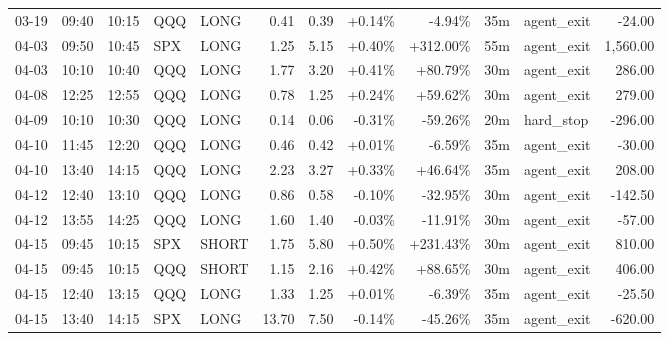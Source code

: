 \documentclass[11pt,a4paper,twoside]{article}
\begin{document}
\begin{center}
\begin{longtable}{>{\color{txtmain}}l l l l l r r r r r >{\color{txtmain}}l r}
03-19 & 09:40 & 10:15 & QQQ & LONG & 0.41 & 0.39 & \textcolor{wingreen}{+0.14\%} & \textcolor{lossred}{-4.94\%} & 35m & agent\_exit & \textcolor{lossred}{-24.00} \\
04-03 & 09:50 & 10:45 & SPX & LONG & 1.25 & 5.15 & \textcolor{wingreen}{+0.40\%} & \textcolor{wingreen}{+312.00\%} & 55m & agent\_exit & \textcolor{wingreen}{1,560.00} \\
04-03 & 10:10 & 10:40 & QQQ & LONG & 1.77 & 3.20 & \textcolor{wingreen}{+0.41\%} & \textcolor{wingreen}{+80.79\%} & 30m & agent\_exit & \textcolor{wingreen}{286.00} \\
04-08 & 12:25 & 12:55 & QQQ & LONG & 0.78 & 1.25 & \textcolor{wingreen}{+0.24\%} & \textcolor{wingreen}{+59.62\%} & 30m & agent\_exit & \textcolor{wingreen}{279.00} \\
04-09 & 10:10 & 10:30 & QQQ & LONG & 0.14 & 0.06 & \textcolor{lossred}{-0.31\%} & \textcolor{lossred}{-59.26\%} & 20m & hard\_stop & \textcolor{lossred}{-296.00} \\
04-10 & 11:45 & 12:20 & QQQ & LONG & 0.46 & 0.42 & \textcolor{wingreen}{+0.01\%} & \textcolor{lossred}{-6.59\%} & 35m & agent\_exit & \textcolor{lossred}{-30.00} \\
04-10 & 13:40 & 14:15 & QQQ & LONG & 2.23 & 3.27 & \textcolor{wingreen}{+0.33\%} & \textcolor{wingreen}{+46.64\%} & 35m & agent\_exit & \textcolor{wingreen}{208.00} \\
04-12 & 12:40 & 13:10 & QQQ & LONG & 0.86 & 0.58 & \textcolor{lossred}{-0.10\%} & \textcolor{lossred}{-32.95\%} & 30m & agent\_exit & \textcolor{lossred}{-142.50} \\
04-12 & 13:55 & 14:25 & QQQ & LONG & 1.60 & 1.40 & \textcolor{lossred}{-0.03\%} & \textcolor{lossred}{-11.91\%} & 30m & agent\_exit & \textcolor{lossred}{-57.00} \\
04-15 & 09:45 & 10:15 & SPX & SHORT & 1.75 & 5.80 & \textcolor{wingreen}{+0.50\%} & \textcolor{wingreen}{+231.43\%} & 30m & agent\_exit & \textcolor{wingreen}{810.00} \\
04-15 & 09:45 & 10:15 & QQQ & SHORT & 1.15 & 2.16 & \textcolor{wingreen}{+0.42\%} & \textcolor{wingreen}{+88.65\%} & 30m & agent\_exit & \textcolor{wingreen}{406.00} \\
04-15 & 12:40 & 13:15 & QQQ & LONG & 1.33 & 1.25 & \textcolor{wingreen}{+0.01\%} & \textcolor{lossred}{-6.39\%} & 35m & agent\_exit & \textcolor{lossred}{-25.50} \\
04-15 & 13:40 & 14:15 & SPX & LONG & 13.70 & 7.50 & \textcolor{lossred}{-0.14\%} & \textcolor{lossred}{-45.26\%} & 35m & agent\_exit & \textcolor{lossred}{-620.00} \\

\end{longtable}
\end{center}
\end{document}
